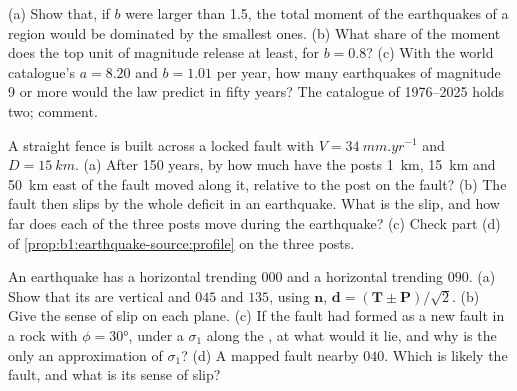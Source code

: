 \begin{exercise}[$\star\star\star$]\label{exo:b1:earthquake-source:10}
(a) Show that, if $b$ were larger than 1.5, the total moment of the earthquakes
of a region would be dominated by the smallest ones. (b) What share of the
moment does the top unit of magnitude release at least, for $b = 0.8$? (c) With
the world catalogue's $a = 8.20$ and $b = 1.01$ per year, how many earthquakes of
magnitude 9 or more would the law predict in fifty years? The catalogue of
1976--2025 holds two; comment.
\end{exercise}

\begin{exercise}[$\star\star\star$]\label{exo:b1:earthquake-source:11}
A straight fence is built across a locked  fault with $V =
\qty{34}{mm.yr^{-1}}$ and $D = \qty{15}{km}$. (a) After 150 years, by how much
have the posts \qty{1}{km}, \qty{15}{km} and \qty{50}{km} east of the fault
moved along it, relative to the post on the fault? (b) The fault then slips by
the whole deficit in an earthquake. What is the slip, and how far does each of
the three posts move during the earthquake? (c) Check part (d) of
\cref{prop:b1:earthquake-source:profile} on the three posts.
\end{exercise}

\begin{exercise}[$\star\star\star$]\label{exo:b1:earthquake-source:12}
An earthquake has a horizontal  trending $000$ and a horizontal 
trending $090$. (a) Show that its  are vertical and  $045$
and $135$, using $\mathbf n$, $\mathbf d = (\mathbf T \pm \mathbf P)/\sqrt2$.
(b) Give the sense of slip on each plane. (c) If the fault had formed as a new
fault in a rock with $\phi = \ang{30}$, under a $\sigma_1$ along the ,
at what  would it lie, and why is the  only an approximation of
$\sigma_1$? (d) A mapped fault nearby  $040$. Which  is
likely the fault, and what is its sense of slip?
\end{exercise}

